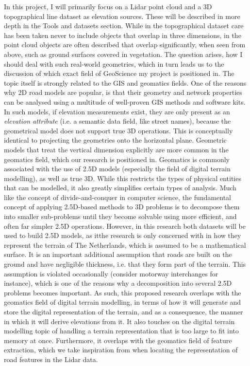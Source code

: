 In this project, I will primarily focus on a Lidar point cloud and a 3D topographical line dataset as elevation sources. These will be described in more depth in the Tools and datasets section. While in the topographical dataset care has been taken never to include objects that overlap in three dimensions, in the point cloud objects are often described that overlap significantly, when seen from above, such as ground surfaces covered in vegetation. The question arises, how I should deal with such real-world geometries, which in turn leads us to the discussion of which exact field of GeoScience my project is positioned in. The topic itself is strongly related to the GIS and geomatics fields. One of the reasons why 2D road models are popular, is that their geometry and network properties can be analysed using a multitude of well-proven GIS methods and software kits. In such models, if elevation measurements exist, they are only present as an \textit{elevation attribute} (i.e. a semantic data field, like street names), because the geometrical model does not support true 3D operations. This is conceptually identical to projecting the geometries onto the horizontal plane. Geometric models that treat the vertical dimension explicitly are more common in the geomatics field, which our research is positioned in. Geomatics is commonly associated with the use of 2.5D models (especially the field of digital terrain modelling), as well as true 3D. While this restricts the types of physical entities that can be modelled, it also greatly simplifies certain types of analysis. Much like the concept of divide-and-conquer in computer science, the fundamental concept of applying 2.5D-based methods to 3D problems is to decompose them into smaller sub-problems until they become solvable using more efficient, and often far simpler 2.5D operations. However, in this research both datasets will be used to build 2.5D models, as itthe research is only concerned with in how they  represent the terrain of The Netherlands, which is assumed to be a mathematical surface. It is an important additional assumption that roads are built on the ground and have negligible thickness, i.e. that they form part of the terrain. This assumption is violated occasionally (consider motorway interchanges for instance), which is one of the reasons why a decomposition into several 2.5D problems becomes important. As such, this proposed research overlaps with the geomatics field of digital terrain modelling, in terms of how it will generate and store the digital representation of the terrain, and as a consequence, the manner in which it will derive elevations from it. It also touches on the digital terrain modelling topic of handling a terrain representation that is too large to fit into memory at once. Furthermore, it overlaps with the geomatics field of feature extraction, which we take inspiration from when locating the representation of road features in the Lidar data.